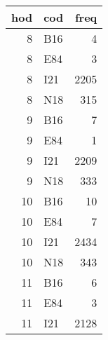 \begin{tabular}{rlr}
  \toprule
 hod & cod & freq \\ 
  \midrule
    8 & B16 &   4 \\ 
    8 & E84 &   3 \\ 
    8 & I21 & 2205 \\ 
    8 & N18 & 315 \\ 
    9 & B16 &   7 \\ 
    9 & E84 &   1 \\ 
    9 & I21 & 2209 \\ 
    9 & N18 & 333 \\ 
   10 & B16 &  10 \\ 
   10 & E84 &   7 \\ 
   10 & I21 & 2434 \\ 
   10 & N18 & 343 \\ 
   11 & B16 &   6 \\ 
   11 & E84 &   3 \\ 
   11 & I21 & 2128 \\ 
   \bottomrule
\end{tabular}
